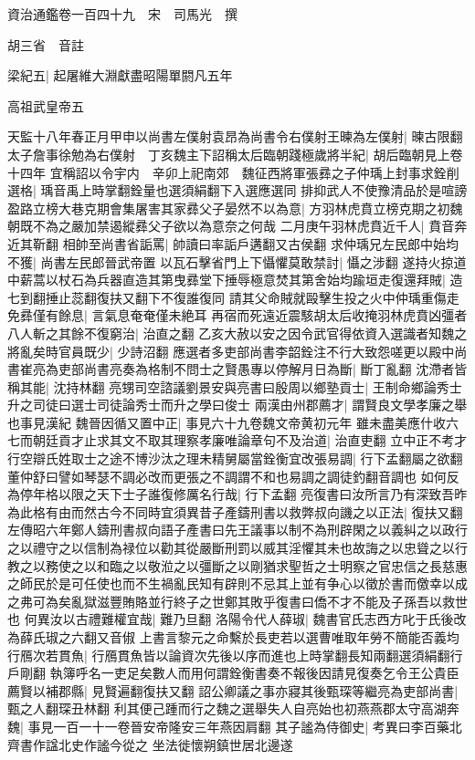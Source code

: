 資治通鑑卷一百四十九　宋　司馬光　撰

胡三省　音註

梁紀五|{
	起屠維大淵獻盡昭陽單閼凡五年}


高祖武皇帝五

天監十八年春正月甲申以尚書左僕射袁昂為尚書令右僕射王暕為左僕射|{
	暕古限翻}
太子詹事徐勉為右僕射　丁亥魏主下詔稱太后臨朝踐極歲將半紀|{
	胡后臨朝見上卷十四年}
宜稱詔以令宇内　辛卯上祀南郊　魏征西將軍張彞之子仲瑀上封事求銓削選格|{
	瑀音禹上時掌翻銓量也選須絹翻下入選應選同}
排抑武人不使豫清品於是喧謗盈路立榜大巷克期會集屠害其家彞父子晏然不以為意|{
	方羽林虎賁立榜克期之初魏朝既不為之嚴加禁遏縱彞父子欲以為意奈之何哉}
二月庚午羽林虎賁近千人|{
	賁音奔近其靳翻}
相帥至尚書省詬罵|{
	帥讀曰率詬戶遘翻又古侯翻}
求仲瑀兄左民郎中始均不獲|{
	尚書左民郎晉武帝置}
以瓦石擊省門上下懾懼莫敢禁討|{
	懾之涉翻}
遂持火掠道中薪蒿以杖石為兵器直造其第曳彞堂下捶辱極意焚其第舍始均踰垣走復還拜賊|{
	造七到翻捶止蕊翻復扶又翻下不復誰復同}
請其父命賊就毆擊生投之火中仲瑀重傷走免彞僅有餘息|{
	言氣息奄奄僅未絶耳}
再宿而死遠近震駭胡太后收掩羽林虎賁凶彊者八人斬之其餘不復窮治|{
	治直之翻}
乙亥大赦以安之因令武官得依資入選識者知魏之將亂矣時官員既少|{
	少詩沼翻}
應選者多吏部尚書李韶銓注不行大致怨嗟更以殿中尚書崔亮為吏部尚書亮奏為格制不問士之賢愚專以停解月日為斷|{
	斷丁亂翻}
沈滯者皆稱其能|{
	沈持林翻}
亮甥司空諮議劉景安與亮書曰殷周以鄉塾貢士|{
	王制命鄉論秀士升之司徒曰選士司徒論秀士而升之學曰俊士}
兩漢由州郡薦才|{
	謂賢良文學孝廉之舉也事見漢紀}
魏晉因循又置中正|{
	事見六十九卷魏文帝黄初元年}
雖未盡美應什收六七而朝廷貢才止求其文不取其理察孝廉唯論章句不及治道|{
	治直吏翻}
立中正不考才行空辯氏姓取士之途不博沙汰之理未精舅屬當銓衡宜改張易調|{
	行下孟翻屬之欲翻董仲舒曰譬如琴瑟不調必改而更張之不調謂不和也易調之調徒釣翻音調也}
如何反為停年格以限之天下士子誰復修厲名行哉|{
	行下孟翻}
亮復書曰汝所言乃有深致吾昨為此格有由而然古今不同時宜須異昔子產鑄刑書以救弊叔向譏之以正法|{
	復扶又翻左傳昭六年鄭人鑄刑書叔向語子產書曰先王議事以制不為刑辟閑之以義糾之以政行之以禮守之以信制為禄位以勸其從嚴斷刑罰以威其淫懼其未也故誨之以忠聳之以行教之以務使之以和臨之以敬涖之以彊斷之以剛猶求聖哲之士明察之官忠信之長慈惠之師民於是可任使也而不生禍亂民知有辟則不忌其上並有争心以徵於書而儌幸以成之弗可為矣亂獄滋豐賄賂並行終子之世鄭其敗乎復書曰僑不才不能及子孫吾以救世也}
何異汝以古禮難權宜哉|{
	難乃旦翻}
洛陽令代人薛琡|{
	魏書官氏志西方叱于氏後改為薛氏琡之六翻又音俶}
上書言黎元之命繫於長吏若以選曹唯取年勞不簡能否義均行鴈次若貫魚|{
	行鴈貫魚皆以論資次先後以序而進也上時掌翻長知兩翻選須絹翻行戶剛翻}
執簿呼名一吏足矣數人而用何謂銓衡書奏不報後因請見復奏乞令王公貴臣薦賢以補郡縣|{
	見賢遍翻復扶又翻}
詔公卿議之事亦寢其後甄琛等繼亮為吏部尚書|{
	甄之人翻琛丑林翻}
利其便己踵而行之魏之選舉失人自亮始也初燕燕郡太守高湖奔魏|{
	事見一百一十一卷晉安帝隆安三年燕因肩翻}
其子謐為侍御史|{
	考異曰李百藥北齊書作諡北史作謐今從之}
坐法徙懷朔鎮世居北邊遂

